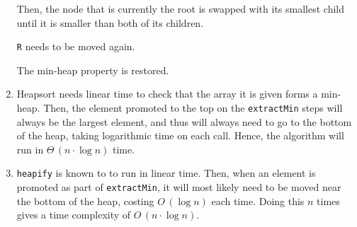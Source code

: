 \documentclass[11pt]{article}
\begin{document}
\begin{enumerate}

  Then, the node that is currently the root is swapped with its smallest child until it is smaller than both of its children.


  \texttt R needs to be moved again.


  The min-heap property is restored.
\item Heapsort needs linear time to check that the array it is given forms a min-heap. Then, the element promoted to the top on the \texttt{extractMin} steps will always be the largest element, and thus will always need to go to the bottom of the heap, taking logarithmic time on each call. Hence, the algorithm will run in \(\Theta\,\left( n\cdot\log n \right)\) time.
\item \texttt{heapify} is known to to run in linear time. Then, when an element is promoted as part of \texttt{extractMin}, it will most likely need to be moved near the bottom of the heap, costing \(O\,\left( \log n \right)\) each time. Doing this \(n\) times gives a time complexity of \(O\,\left( n\cdot\log n \right)\).
\end{enumerate}
\end{document}
